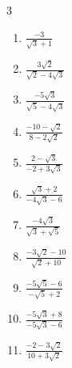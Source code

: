 \begin{multicols}{3}
\begin{enumerate}
  \item $\displaystyle \frac{-3}{\sqrt{3}+1}$


  \item $\displaystyle \frac{3\sqrt{2}}{\sqrt{2}-4\sqrt{3}}$


\columnbreak %

  \item $\displaystyle \frac{-5\sqrt{3}}{\sqrt{5}-4\sqrt{3}}$


  \item $\displaystyle \frac{-10-\sqrt{2}}{8-2\sqrt{2}}$


  \item $\displaystyle \frac{2-\sqrt{3}}{-2+3\sqrt{3}}$


  \item $\displaystyle \frac{\sqrt{3}+2}{-4\sqrt{3}-6}$


  \item $\displaystyle \frac{-4\sqrt{3}}{\sqrt{3}+\sqrt{5}}$


\columnbreak %

  \item $\displaystyle \frac{-3\sqrt{2}-10}{\sqrt{2}+10}$


  \item $\displaystyle \frac{-5\sqrt{5}-6}{-\sqrt{5}+2}$


  \item $\displaystyle \frac{-5\sqrt{3}+8}{-5\sqrt{3}-6}$


  \item $\displaystyle \frac{-2-3\sqrt{2}}{10+3\sqrt{2}}$


\end{enumerate}
\end{multicols}
